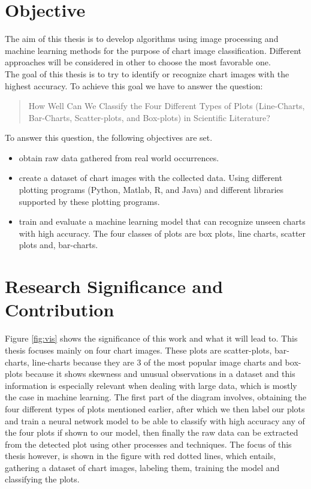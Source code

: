 \documentclass[12pt, a4paper,oneside]{report}
\begin{document}
\section{Objective}
The aim of this thesis is to develop algorithms using image processing and machine learning methods for the purpose of chart image classification. Different approaches will be considered in other to choose the most favorable one.\\
The goal of this thesis is to try to identify or recognize chart images with the highest accuracy. To achieve this goal we have to answer the question: \begin{quote} How Well Can We Classify the Four Different Types of Plots (Line-Charts, Bar-Charts, Scatter-plots, and Box-plots) in Scientific Literature? \end{quote} 
To answer this question, the following objectives are set.

\begin{itemize}\itemsep3pt
	\item obtain raw data gathered from real world occurrences.
	\item create a dataset of chart images with the collected data. Using  different plotting programs (Python, Matlab, R, and Java) and different libraries supported by these plotting programs.
	\item train and evaluate a machine learning model that can recognize unseen charts with high accuracy. The four classes of plots are box plots, line charts, scatter plots and, bar-charts.
\end{itemize}

\section{Research Significance and Contribution}
Figure \ref{fig:vis} shows the significance of this work and what it will lead to. This thesis focuses mainly on four chart images. These plots are scatter-plots, bar-charts, line-charts because they are 3 of the most popular image charts and box-plots because it shows skewness and unusual observations in a dataset and this information is especially relevant when dealing with large data, which is mostly the case in machine learning. The first part of the diagram involves, obtaining  the four different types of plots mentioned earlier, after which we then label our plots and train a neural network model to be able to classify with high accuracy any of the four plots if shown to our model, then finally the raw data can be extracted from the detected plot using other processes and techniques. The focus of this thesis however, is shown in the figure with red dotted lines, which entails, gathering a dataset of chart images, labeling them, training the model and classifying the plots. \\
\end{document}
